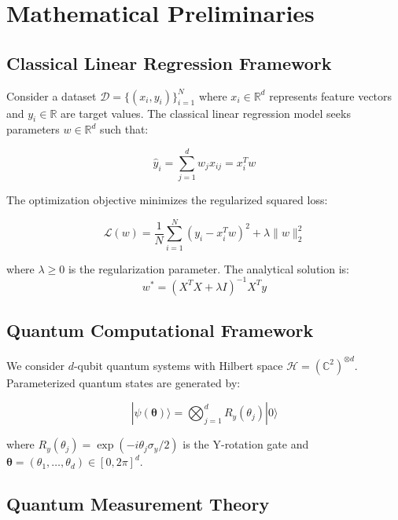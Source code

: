\documentclass[11pt]{article}
\begin{document}
\section{Mathematical Preliminaries}

\subsection{Classical Linear Regression Framework}

Consider a dataset $\mathcal{D} = \{(x_i, y_i)\}_{i=1}^N$ where $x_i \in \mathbb{R}^d$ represents feature vectors and $y_i \in \mathbb{R}$ are target values. The classical linear regression model seeks parameters $w \in \mathbb{R}^d$ such that:

\begin{equation}
\hat{y}_i = \sum_{j=1}^d w_j x_{ij} = x_i^T w
\label{eq:classical_prediction}
\end{equation}

The optimization objective minimizes the regularized squared loss:

\begin{equation}
\mathcal{L}(w) = \frac{1}{N} \sum_{i=1}^N (y_i - x_i^T w)^2 + \lambda \|w\|_2^2
\label{eq:classical_loss}
\end{equation}

where $\lambda \geq 0$ is the regularization parameter. The analytical solution is:
\begin{equation}
w^* = (X^T X + \lambda I)^{-1} X^T y
\label{eq:classical_solution}
\end{equation}

\subsection{Quantum Computational Framework}

We consider $d$-qubit quantum systems with Hilbert space $\mathcal{H} = (\mathbb{C}^2)^{\otimes d}$. Parameterized quantum states are generated by:

\begin{equation}
|\psi(\bm{\theta})\rangle = \bigotimes_{j=1}^d R_y(\theta_j) |0\rangle
\label{eq:quantum_state}
\end{equation}

where $R_y(\theta_j) = \exp(-i\theta_j \sigma_y/2)$ is the Y-rotation gate and $\bm{\theta} = (\theta_1, \ldots, \theta_d) \in [0, 2\pi]^d$.

\subsection{Quantum Measurement Theory}
\end{document}
